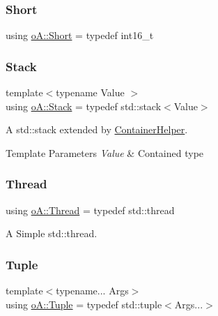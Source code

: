 \mbox{\label{namespaceo_a_a17d2753cd7febb25f447b0cff6cec6eb}} 
\subsubsection{\texorpdfstring{Short}{Short}}
{\footnotesize\ttfamily using \mbox{\hyperlink{namespaceo_a_a17d2753cd7febb25f447b0cff6cec6eb}{o\+A\+::\+Short}} = typedef int16\+\_\+t}

\mbox{\label{namespaceo_a_a992ff8d32ca8c60ad68cbd56834bbeec}} 
\subsubsection{\texorpdfstring{Stack}{Stack}}
{\footnotesize\ttfamily template$<$typename Value $>$ \\
using \mbox{\hyperlink{namespaceo_a_a992ff8d32ca8c60ad68cbd56834bbeec}{o\+A\+::\+Stack}} = typedef std\+::stack$<$Value$>$}



A std\+::stack extended by \mbox{\hyperlink{classo_a_1_1_container_helper}{Container\+Helper}}. 


\begin{DoxyTemplParams}{Template Parameters}
{\em Value} & Contained type \\
\hline
\end{DoxyTemplParams}
\mbox{\label{namespaceo_a_a38e502e26381eb0b98c9a03430e4dcce}} 
\subsubsection{\texorpdfstring{Thread}{Thread}}
{\footnotesize\ttfamily using \mbox{\hyperlink{namespaceo_a_a38e502e26381eb0b98c9a03430e4dcce}{o\+A\+::\+Thread}} = typedef std\+::thread}



A Simple std\+::thread. 

\mbox{\label{namespaceo_a_a9b376768abd013e69cacd776d0356c08}} 
\subsubsection{\texorpdfstring{Tuple}{Tuple}}
{\footnotesize\ttfamily template$<$typename... Args$>$ \\
using \mbox{\hyperlink{namespaceo_a_a9b376768abd013e69cacd776d0356c08}{o\+A\+::\+Tuple}} = typedef std\+::tuple$<$Args...$>$}



